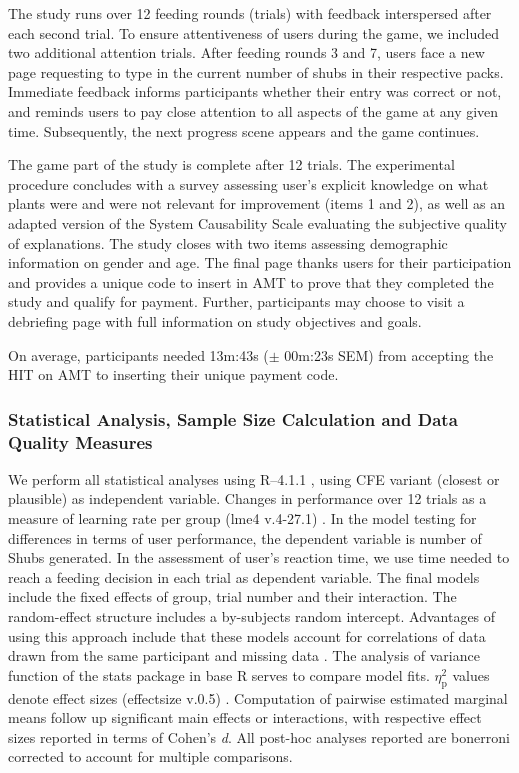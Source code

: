 The study runs over 12 feeding rounds (trials) with feedback interspersed after each second trial. 
To ensure attentiveness of users during the game, we included two additional attention trials.
After feeding rounds 3 and 7, users face a new page requesting to type in the current number of shubs in their respective packs.
Immediate feedback informs participants whether their entry was correct or not, and reminds users to pay close attention to all aspects of the game at any given time.
Subsequently, the next progress scene appears and the game continues. 

The game part of the study is complete after 12 trials.
The experimental procedure concludes with a survey assessing user's explicit knowledge on what plants were and were not relevant for improvement (items 1 and 2), as well as an adapted version of the System Causability Scale \cite{holzinger_measuring_2020} evaluating the subjective quality of explanations.
The study closes with two items assessing demographic information on gender and age.
The final page thanks users for their participation and provides a unique code to insert in \gls{AMT} to prove that they completed the study and qualify for payment. 
Further, participants may choose to visit a debriefing page with full information on study objectives and goals. 

On average, participants needed 13m:43s ($\pm$ 00m:23s SEM) from accepting the HIT on AMT to inserting their unique payment code.

\subsubsection{Statistical Analysis, Sample Size Calculation and Data Quality Measures}

We perform all statistical analyses using R–4.1.1 \citep{r_core_team_r_2021}, using \gls{CFE} variant (closest or plausible) as independent variable.
Changes in performance over 12 trials as a measure of learning rate per group (lme4 v.4-27.1) \citep{bates_fitting_2015}.
In the model testing for differences in terms of user performance, the dependent variable is number of Shubs generated. 
In the assessment of user's reaction time, we use time needed to reach a feeding decision in each trial as dependent variable.
The final models include the fixed effects of group, trial number and their interaction. The random-effect structure includes a by-subjects random intercept. 
Advantages of using this approach include that these models account for correlations of data drawn from the same participant and missing data \citep{detry_analyzing_2016,muth_alternative_2016}.
The analysis of variance function of the stats package in base R serves to compare model fits.
$\eta_{\text{p}}^{2}$ values denote effect sizes (effectsize v.0.5) \citep{ben-shachar_effectsize_2020}.
Computation of pairwise estimated marginal means follow up significant main effects or interactions, with respective effect sizes reported in terms of Cohen’s \textit{d}.
All post-hoc analyses reported are bonerroni corrected to account for multiple comparisons.

